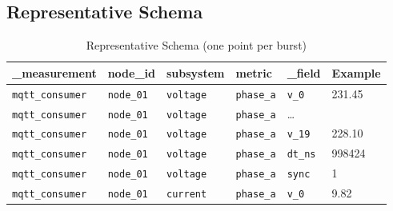 \subsection{Representative Schema}
\begin{table}[H]
  \caption{Representative Schema (one point per burst)}
  \begin{center}
    \begin{tabular}{llllll}
      \hline
      \textbf{\_measurement} & \textbf{node\_id} & \textbf{subsystem} & \textbf{metric} & \textbf{\_field} & \textbf{Example} \\
      \hline
      \texttt{mqtt\_consumer} & \texttt{node\_01} & \texttt{voltage} & \texttt{phase\_a} & \texttt{v\_0} & 231.45 \\
      \texttt{mqtt\_consumer} & \texttt{node\_01} & \texttt{voltage} & \texttt{phase\_a} & \ldots & \\
      \texttt{mqtt\_consumer} & \texttt{node\_01} & \texttt{voltage} & \texttt{phase\_a} & \texttt{v\_19} & 228.10 \\
      \texttt{mqtt\_consumer} & \texttt{node\_01} & \texttt{voltage} & \texttt{phase\_a} & \texttt{dt\_ns} & 998424 \\
      \texttt{mqtt\_consumer} & \texttt{node\_01} & \texttt{voltage} & \texttt{phase\_a} & \texttt{sync} & 1 \\
      \texttt{mqtt\_consumer} & \texttt{node\_01} & \texttt{current} & \texttt{phase\_a} & \texttt{v\_0} & 9.82 \\
      \hline
    \end{tabular}
  \end{center}
\end{table}
